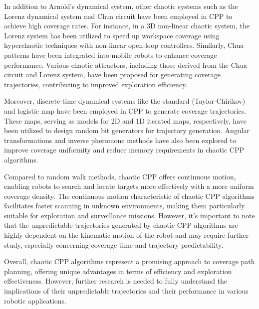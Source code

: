 \vspace*{6mm}

In addition to Arnold's dynamical system, other chaotic systems such as the Lorenz dynamical system and Chua circuit have been employed in CPP to achieve high coverage rates. For instance, in a 3D non-linear chaotic system, the Lorenz system has been utilized to speed up workspace coverage using hyperchaotic techniques with non-linear open-loop controllers. Similarly, Chua patterns have been integrated into mobile robots to enhance coverage performance. Various chaotic attractors, including those derived from the Chua circuit and Lorenz system, have been proposed for generating coverage trajectories, contributing to improved exploration efficiency.

\vspace*{6mm}

Moreover, discrete-time dynamical systems like the standard (Taylor-Chirikov) and logistic map have been employed in CPP to generate coverage trajectories. These maps, serving as models for 2D and 1D iterated maps, respectively, have been utilized to design random bit generators for trajectory generation. Angular transformations and inverse pheromone methods have also been explored to improve coverage uniformity and reduce memory requirements in chaotic CPP algorithms.

\vspace*{6mm}

Compared to random walk methods, chaotic CPP offers continuous motion, enabling robots to search and locate targets more effectively with a more uniform coverage density. The continuous motion characteristic of chaotic CPP algorithms facilitates faster scanning in unknown environments, making them particularly suitable for exploration and surveillance missions. However, it's important to note that the unpredictable trajectories generated by chaotic CPP algorithms are highly dependent on the kinematic motion of the robot and may require further study, especially concerning coverage time and trajectory predictability.

\vspace*{6mm}

Overall, chaotic CPP algorithms represent a promising approach to coverage path planning, offering unique advantages in terms of efficiency and exploration effectiveness. However, further research is needed to fully understand the implications of their unpredictable trajectories and their performance in various robotic applications.


